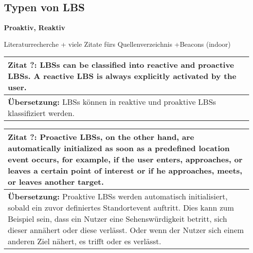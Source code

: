 \subsection{Typen von LBS}

\textbf{Proaktiv, Reaktiv}

Literaturrecherche + viele Zitate fürs Quellenverzeichnis +Beacons (indoor)

\begin{table}[h]
	\centering
	\begin{tabular}{|p{16cm}|}\hline
		\textbf{Zitat ?:} \glqq LBSs can be classified into reactive and proactive LBSs. A reactive LBS is always explicitly activated by the user. \cite[S.3]{Kuepper2005} \\ \hline
		\textbf{Übersetzung:} LBSs können in reaktive und proaktive LBSs klassifiziert werden. \\ \hline
	\end{tabular}
\end{table}


\begin{table}[h]
	\centering
	\begin{tabular}{|p{16cm}|}\hline
		\textbf{Zitat ?:} \glqq Proactive LBSs, on the other hand, are automatically initialized as soon as a predefined location event occurs, for example, if the user enters, approaches, or leaves a certain point of interest or if he approaches, meets, or leaves another target. \cite[S.3]{Kuepper2005} \\ \hline
		\textbf{Übersetzung:} Proaktive LBSs werden automatisch initialisiert, sobald ein zuvor definiertes Standortevent auftritt. Dies kann zum Beispiel sein, dass ein Nutzer eine Sehenswürdigkeit betritt, sich dieser annähert oder diese verlässt. Oder wenn der Nutzer sich einem anderen Ziel nähert, es trifft oder es verlässt. \\ \hline
	\end{tabular}
\end{table}


